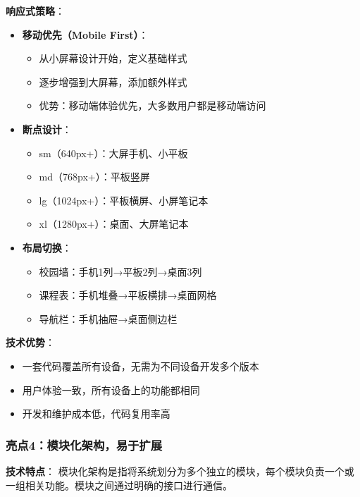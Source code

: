 \documentclass[12pt,a4paper]{article}
\begin{document}
\textbf{响应式策略}：
\begin{itemize}
    \item \textbf{移动优先（Mobile First）}：
        \begin{itemize}
            \item 从小屏幕设计开始，定义基础样式
            \item 逐步增强到大屏幕，添加额外样式
            \item 优势：移动端体验优先，大多数用户都是移动端访问
        \end{itemize}
    \item \textbf{断点设计}：
        \begin{itemize}
            \item sm（640px+）：大屏手机、小平板
            \item md（768px+）：平板竖屏
            \item lg（1024px+）：平板横屏、小屏笔记本
            \item xl（1280px+）：桌面、大屏笔记本
        \end{itemize}
    \item \textbf{布局切换}：
        \begin{itemize}
            \item 校园墙：手机1列→平板2列→桌面3列
            \item 课程表：手机堆叠→平板横排→桌面网格
            \item 导航栏：手机抽屉→桌面侧边栏
        \end{itemize}
\end{itemize}

\textbf{技术优势}：
\begin{itemize}
    \item 一套代码覆盖所有设备，无需为不同设备开发多个版本
    \item 用户体验一致，所有设备上的功能都相同
    \item 开发和维护成本低，代码复用率高
\end{itemize}

\subsubsection{亮点4：模块化架构，易于扩展}

\textbf{技术特点}：
模块化架构是指将系统划分为多个独立的模块，每个模块负责一个或一组相关功能。模块之间通过明确的接口进行通信。
\end{document}
